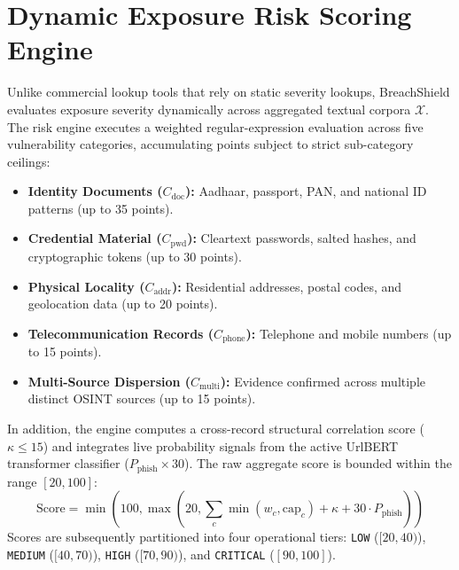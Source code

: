 \documentclass[conference]{IEEEtran}
\begin{document}
\section{Dynamic Exposure Risk Scoring Engine}
\label{sec:risk}
Unlike commercial lookup tools that rely on static severity lookups, BreachShield evaluates exposure severity dynamically across aggregated textual corpora $\mathcal{X}$. The risk engine executes a weighted regular-expression evaluation across five vulnerability categories, accumulating points subject to strict sub-category ceilings:
\begin{itemize}
    \item \textbf{Identity Documents ($C_{\text{doc}}$):} Aadhaar, passport, PAN, and national ID patterns (up to 35 points).
    \item \textbf{Credential Material ($C_{\text{pwd}}$):} Cleartext passwords, salted hashes, and cryptographic tokens (up to 30 points).
    \item \textbf{Physical Locality ($C_{\text{addr}}$):} Residential addresses, postal codes, and geolocation data (up to 20 points).
    \item \textbf{Telecommunication Records ($C_{\text{phone}}$):} Telephone and mobile numbers (up to 15 points).
    \item \textbf{Multi-Source Dispersion ($C_{\text{multi}}$):} Evidence confirmed across multiple distinct OSINT sources (up to 15 points).
\end{itemize}

In addition, the engine computes a cross-record structural correlation score ($\kappa \le 15$) and integrates live probability signals from the active UrlBERT transformer classifier ($P_{\text{phish}} \times 30$). The raw aggregate score is bounded within the range $[20, 100]$:
\begin{equation}
\text{Score} = \min\left(100, \max\left(20, \sum_{c} \min(w_c, \text{cap}_c) + \kappa + 30 \cdot P_{\text{phish}}\right)\right)
\end{equation}
Scores are subsequently partitioned into four operational tiers: \texttt{LOW} ($[20, 40)$), \texttt{MEDIUM} ($[40, 70)$), \texttt{HIGH} ($[70, 90)$), and \texttt{CRITICAL} ($[90, 100]$).
\end{document}
